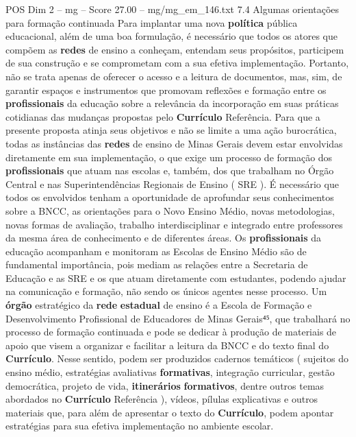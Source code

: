 \begin{textsample}{POS Dim 2 – mg – Score 27.00 – mg/mg\_em\_146.txt}  \label{ex:f2_pos_193}
7.4 Algumas orientações para formação continuada Para implantar uma nova \textbf{política} pública educacional, além de uma boa formulação, é necessário que todos os atores que compõem as \textbf{redes} de ensino a conheçam, entendam seus propósitos, participem de sua construção e se comprometam com a sua efetiva implementação.
Portanto, não se trata apenas de oferecer o acesso e a leitura de documentos, mas, sim, de garantir espaços e instrumentos que promovam reflexões e formação entre os \textbf{profissionais} da educação sobre a relevância da incorporação em suas práticas cotidianas das mudanças propostas pelo \textbf{Currículo} Referência.
Para que a presente proposta atinja seus objetivos e não se limite a uma ação burocrática, todas as instâncias das \textbf{redes} de ensino de Minas Gerais devem estar envolvidas diretamente em sua implementação, o que exige um processo de formação dos \textbf{profissionais} que atuam nas escolas e, também, dos que trabalham no Órgão Central e nas Superintendências Regionais de Ensino ( SRE ).
É necessário que todos os envolvidos tenham a oportunidade de aprofundar seus conhecimentos sobre a BNCC, as orientações para o Novo Ensino Médio, novas metodologias, novas formas de avaliação, trabalho interdisciplinar e integrado entre professores da mesma área de conhecimento e de diferentes áreas.
Os \textbf{profissionais} da educação acompanham e monitoram as Escolas de Ensino Médio são de fundamental importância, pois mediam as relações entre a Secretaria de Educação e as SRE e os que atuam diretamente com estudantes, podendo ajudar na comunicação e formação, não sendo os únicos agentes nesse processo.
Um \textbf{órgão} estratégico da \textbf{rede} \textbf{estadual} de ensino é a Escola de Formação e Desenvolvimento Profissional de Educadores de Minas Gerais⁴⁵, que trabalhará no processo de formação continuada e pode se dedicar à produção de materiais de apoio que visem a organizar e facilitar a leitura da BNCC e do texto final do \textbf{Currículo}.
Nesse sentido, podem ser produzidos cadernos temáticos ( sujeitos do ensino médio, estratégias avaliativas \textbf{formativas}, integração curricular, gestão democrática, projeto de vida, \textbf{itinerários} \textbf{formativos}, dentre outros temas abordados no \textbf{Currículo} Referência ), vídeos, pílulas explicativas e outros materiais que, para além de apresentar o texto do \textbf{Currículo}, podem apontar estratégias para sua efetiva implementação no ambiente escolar.

\end{textsample}
